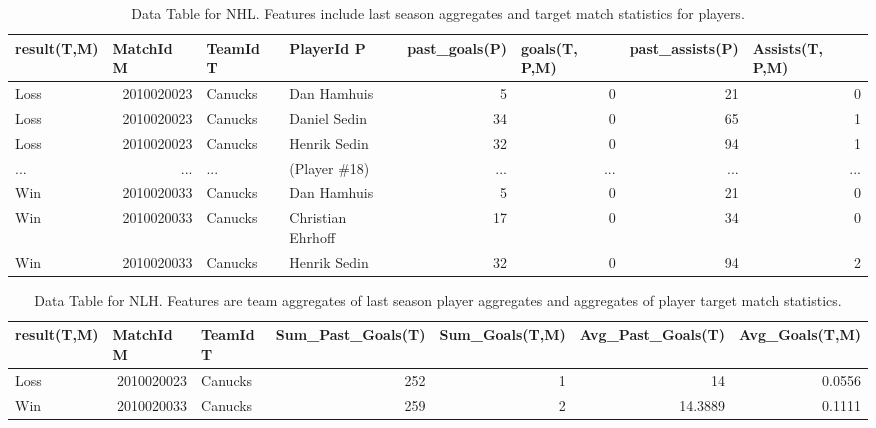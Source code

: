 \documentclass[oribibl]{llncs}%
\newcommand{\team}{T}
\newcommand{\player}{P}
\newcommand{\match}{M}
\begin{document}

\begin{table}[htbp]
\caption{Data Table for NHL. Features include last season aggregates  and target match statistics for players.}
\begin{tabular}{|l|r|l|l|r|r|r|r|}
\hline
result(\team,\match) & \multicolumn{1}{l|}{MatchId \match} & TeamId \team & PlayerId \player& \multicolumn{1}{l|}{past\_goals(\player)} & \multicolumn{1}{l|}{goals(\team, \player,\match)} & \multicolumn{1}{l|}{past\_assists(\player)} & \multicolumn{1}{l|}{Assists(\team, \player,\match)} \\ \hline
Loss & 2010020023 & Canucks & Dan Hamhuis & 5 & 0 & 21 & 0 \\ \hline
Loss & 2010020023 & Canucks & Daniel Sedin & 34 & 0 & 65 & 1 \\ \hline
Loss & 2010020023 & Canucks & Henrik Sedin & 32 & 0 & 94 & 1 \\ \hline
... & %
...& ...  & (Player \#18) & ... & ... & ... & ...%
\\\hline
Win & 2010020033 & Canucks & Dan Hamhuis & 5 & 0 & 21 & 0 \\ \hline
Win & 2010020033 & Canucks & Christian Ehrhoff & 17 & 0 & 34 & 0 \\ \hline
Win & 2010020033 & Canucks & Henrik Sedin & 32 & 0 & 94 & 2 \\ \hline
\end{tabular}
\label{small-join}
\end{table}

\begin{table}[htbp]
\caption{Data Table for NLH. Features are team aggregates of last season player aggregates and aggregates of player target match statistics.}
\begin{tabular}{|l|r|l|r|r|r|r|}
\hline
result(\team,\match) & \multicolumn{1}{l|}{MatchId \match}  & TeamId \team & \multicolumn{1}{l|}{Sum\_Past\_Goals(\team)} & \multicolumn{1}{l|}{Sum\_Goals(\team,\match)} & \multicolumn{1}{l|}{Avg\_Past\_Goals(\team)} & \multicolumn{1}{l|}{Avg\_Goals(\team,\match)} \\ \hline
Loss & 2010020023 & Canucks & 252 & 1 & 14 & 0.0556 \\ \hline
Win & 2010020033 & Canucks & 259 & 2 & 14.3889 & 0.1111 \\ \hline
\end{tabular}
\label{small-aggregate}
\end{table}
\end{document}
